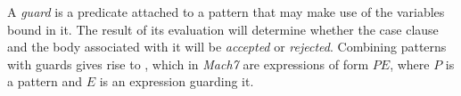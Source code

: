 

A \emph{guard} is a predicate attached to a pattern that may make use of the 
variables bound in it. The result of its evaluation will determine whether the 
case clause and the body associated with it will be \emph{accepted} or 
\emph{rejected}. Combining patterns with guards gives rise to , which in \emph{Mach7} are expressions of form $P$\code{|=}$E$, where $P$ is a 
pattern and $E$ is an expression guarding it.

